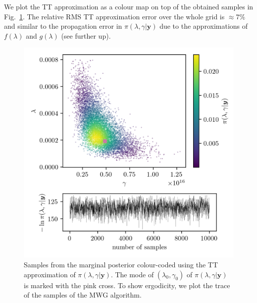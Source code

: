 We plot the TT approximation as a colour map on top of the obtained samples in Fig.~\ref{fig:ScatterPlotTT}.
The relative RMS TT approximation error over the whole grid is $\approx 7\%$ and similar to the propagation error in $\pi(\lambda, \gamma| \bm{y})$ due to the approximations of $f(\lambda)$ and $g(\lambda)$ (see further up).
\begin{figure}[h!]
	\centering
	\includegraphics{ScatterplusHistoPlusTT.png}
	\caption[Samples from marginal posterior and TT approximation; trace plot of the MWG for $\pi(\lambda, \gamma| \bm{y})$]{Samples from the marginal posterior colour-coded using the TT approximation of $\pi(\lambda , \gamma  | \bm{y})$. The mode of $(\lambda_0 , \gamma_0)$ of $\pi(\lambda , \gamma  | \bm{y})$ is marked with the pink cross. To show ergodicity, we plot the trace of the samples of the MWG algorithm.}
	\label{fig:ScatterPlotTT}
\end{figure}

